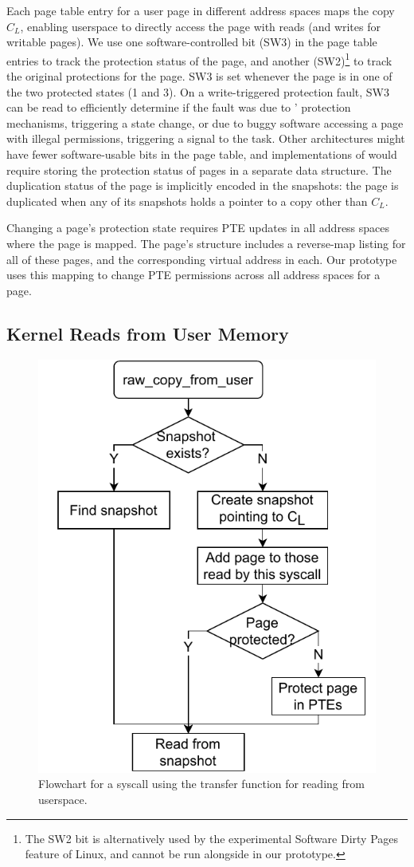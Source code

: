 Each page table entry for a user page in different address spaces
maps the copy $C_L$, enabling userspace to directly access the page
with reads (and writes for writable pages).
We use one software-controlled bit (SW3) in the page table entries
to track the protection status of the page, and another
(SW2)\footnote{The SW2 bit is alternatively used by the experimental Software Dirty Pages feature of
Linux, and cannot be run alongside \midas in our prototype.}
to track the original protections for the page.
SW3 is set whenever the page is in one of the two protected
states (1 and 3).
On a write-triggered protection fault, SW3 can be read to
efficiently determine if the fault was due to \midas' protection
mechanisms, triggering a state change, or due to buggy software
accessing a page with illegal permissions, triggering a signal to
the task.
Other architectures might have fewer software-usable
bits in the page table, and implementations of \midas would
require storing the protection status of pages in a separate data structure.
The duplication status of the page is implicitly encoded in the
snapshots: the page is duplicated when any of its snapshots
holds a pointer to a copy other than $C_L$.

Changing a page's protection state requires PTE updates
in all address spaces where the page is mapped.
The page's  structure includes a reverse-map
listing for all of these pages, and the corresponding virtual
address in each.
Our prototype uses this mapping to change PTE permissions across
all address spaces for a page.


\subsection{Kernel Reads from User Memory}

\begin{figure}[]
  \centering
  \includegraphics[width=0.6\linewidth]{media/midas/copy_from_user.pdf}
  \caption[\midas: Flowchart for the transfer function ]
          {Flowchart for a syscall using the transfer function
          for reading from userspace.}
  \label{fig:midas:copy_from_user}
\end{figure}

